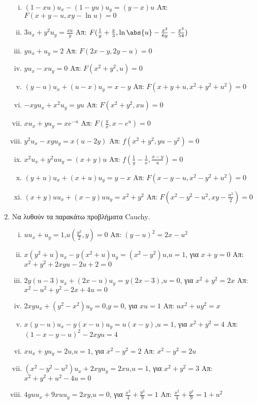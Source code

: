 \begin{enumerate}
 \begin{enumerate}[i)]
   \item $(1-xu)u_{x}-(1-yu)u_{y}=(y-x)u$ \hfill Απ: $F(x+y-u,xy-\ln u)=0$
   \item $3u_{x}+y^{2}u_{y}=\frac{xu}{y}$ \hfill Απ: $F(\frac{1}{y}+\frac{x}{3},\ln\abs{u}-\frac{x^{2}}{6y}-\frac{x^{3}}{54})$
   \item $yu_{x}+u_{y}=2$ \hfill Απ: $F(2x-y,2y-u)=0$
   \item $yu_{x}-xu_{y}=0$ \hfill Απ: $F(x^{2}+y^{2},u)=0$
   \item $(y-u)u_{x}+(u-x)u_{y}=x-y$ \hfill Απ: $F(x+y+u,x^{2}+y^{2}+u^{2})=0$
   \item $-xyu_{x}+x^{2}u_{y}=yu$ \hfill Απ: $F(x^{2}+y^{2},xu)=0$
   \item $xu_{x}+yu_{y}=xe^{-u}$ \hfill Απ: $F(\frac{y}{x},x-e^{u})=0$
   \item $y^{2}u_{x}-xyu_{y}=x(u-2y)$ \hfill Απ: $f(x^{2}+y^{2},yu-y^{2})=0$
   \item $x^{2}u_{x}+y^{2}uu_{y}=(x+y)u$ \hfill Απ: $f(\frac{1}{y}-\frac{1}{x},\frac{x-y}{u})=0$
   \item $(y+u)u_{x}+(x+u)u_{y}=y-x$ \hfill Απ: $F(x-y-u,x^{2}-y^{2}+u^{2})=0$
   \item $(x+y)uu_{x}+(x-y)uu_{y}=x^{2}+y^{2}$ \hfill Απ: $F(x^{2}-y^{2}-u^{2},xy-\frac{u^{2}}{2})=0$




 \end{enumerate}

 \item Να λυθούν τα παρακάτω προβλήματα \textlatin{Cauchy}.

 \begin{enumerate}[i)]
   \item $uu_{x}+u_{y}=1$,\quad $u(\frac{y^{2}}{2},y)=0$ \hfill Απ: $(y-u)^{2}=2x-u^{2}$
   \item $x(y^{2}+u)u_{x}-y(x^{2}+u)u_{y}=(x^{2}-y^{2})u$,\quad $u=1$, για $x+y=0$ \hfill Απ: $x^{2}+y^{2}+2xyu-2u+2=0$
   \item $2y(u-3)u_{x}+(2x-u)u_{y}=y(2x-3)$,\quad $u=0$, για  $x^{2}+y^{2}=2x$ \hfill Απ: $x^{2}-u^{2}+y^{2}-2x+4u=0$
   \item $2xyu_{x}+(y^{2}-x^{2})u_{y}=0$,\quad $y=0$, για $xu=1$ \hfill Απ: $ux^{2}+uy^{2}=x$
   \item $x(y-u)u_{x}-y(x-u)u_{y}=u(x-y)$,\quad $u=1$, για $x^{2}+y^{2}=4$ \hfill Απ: $(1-x-y-u)^{2}-2xyu=4$
   \item $xu_{x}+yu_{y}=2u$,\quad $u=1$, για $x^{2}-y^{2}=2$ \hfill Απ: $x^{2}-y^{2}=2u$
   \item $(x^{2}-y^{2}-u^{2})u_{x}+2xyu_{y}=2xu$,\quad $u=1$, για $x^{2}+y^{2}=3$ \hfill Απ: $x^{2}+y^{2}+u^{2}-4u=0$
   \item $4yuu_{x}+9xuu_{y}=2xy$,\quad $u=0$, για $\frac{x^{2}}{4}+\frac{y^{2}}{9}=1$ \hfill Απ: $\frac{x^{2}}{4}+\frac{y^{2}}{9}=1+u^{2}$
 \end{enumerate}




\end{enumerate}
